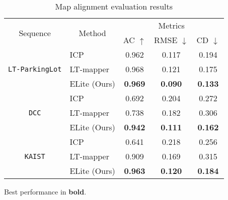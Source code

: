 \begin{table}[!t]
\centering
\caption{Map alignment evaluation results}
\begin{adjustbox}{width=1.0\linewidth}
{
\begin{tabular}{clccc}
\toprule
\multirow{2}{*}{Sequence}       & \multicolumn{1}{c}{\multirow{2}{*}{Method}} & \multicolumn{3}{c}{Metrics} \\  \cmidrule{3-5} 
                                & \multicolumn{1}{c}{}                        & AC $\uparrow$   & RMSE $\downarrow$     & CD $\downarrow$      \\
\midrule
\multirow{3}{*}{\texttt{LT-ParkingLot}} 
                                & ICP \cite{girardeau2016cloudcompare}         & 0.962    & 0.117    & 0.194 \\  
                                & LT-mapper \cite{kim2022lt}                   & 0.968    & 0.121    & 0.175 \\
                                & ELite (Ours)                                 & \textbf{0.969}    & \textbf{0.090}    & \textbf{0.133} \\
\midrule
\multirow{3}{*}{\texttt{DCC}}            
                                & ICP \cite{girardeau2016cloudcompare}         & 0.692     & 0.204    & 0.272 \\
                                & LT-mapper \cite{kim2022lt}                   & 0.738     & 0.182    & 0.306 \\
                                & ELite (Ours)                                 & \textbf{0.942}     & \textbf{0.111}    & \textbf{0.162} \\
\midrule
\multirow{3}{*}{\texttt{KAIST}}          
                                & ICP \cite{girardeau2016cloudcompare}         & 0.641     & 0.218    & 0.256 \\
                                & LT-mapper \cite{kim2022lt}                   & 0.909     & 0.169    & 0.315 \\
                                & ELite (Ours)                                 & \textbf{0.963}     & \textbf{0.120}    & \textbf{0.184} \\
\bottomrule
\end{tabular}
}
\end{adjustbox}
\tiny{ }

\footnotesize
\raggedright
\quad Best performance in \textbf{bold}.
\label{tab:map_eval}
\vspace{-4mm}
\end{table}

